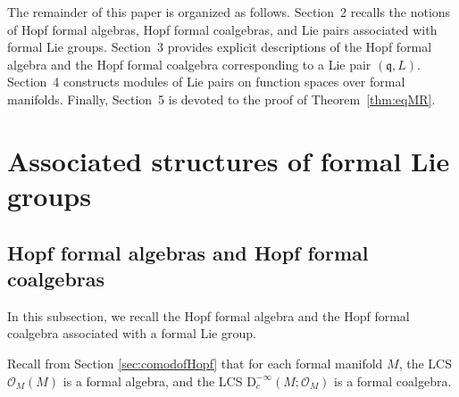 \documentclass[12pt, a4paper]{amsart}
\newcommand{\CO}{{\mathcal {O}}}
\newcommand{\RD}{{\mathrm {D}}}
\newcommand{\q}{\mathfrak q}
\theoremstyle{Theorem}
\theoremstyle{Theorem}
\theoremstyle{Theorem}
\theoremstyle{Theorem}
\theoremstyle{Plain}
\theoremstyle{remark}
\theoremstyle{remark}
\theoremstyle{Definition}
\newtheorem{dfn}{Definition}[section]
\numberwithin{equation}{section}
\begin{document}





The remainder of this paper is organized as follows. 
Section~2 recalls the notions of Hopf formal algebras, Hopf formal coalgebras, and Lie pairs associated with formal Lie groups. 
Section~3 provides explicit descriptions of the Hopf formal algebra and the Hopf formal coalgebra corresponding to a Lie pair $(\mathfrak{q}, L)$. 
Section~4 constructs modules of Lie pairs on function spaces over formal manifolds. 
Finally, Section~5 is devoted to the proof of Theorem~\ref{thm:eqMR}.





\section{Associated structures of formal Lie groups}
\subsection{Hopf formal algebras and Hopf formal coalgebras}
 In this subsection, we recall the Hopf formal algebra and the Hopf formal coalgebra associated with a formal Lie group.

Recall from Section \ref{sec:comodofHopf} that for each formal manifold $M$, the LCS $\CO_M(M)$ is a formal algebra, and the LCS $\RD^{-\infty}_c(M;\CO_M)$ is a formal coalgebra. 
\end{document}
